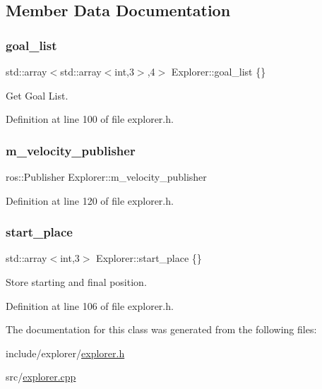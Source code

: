 \subsection{Member Data Documentation}
\mbox{\label{class_explorer_acda1856f421dfe836f39de446415b969}} 
\subsubsection{\texorpdfstring{goal\+\_\+list}{goal\_list}}
{\footnotesize\ttfamily std\+::array$<$std\+::array$<$int,3$>$,4$>$ Explorer\+::goal\+\_\+list \{\}}



Get Goal List. 



Definition at line 100 of file explorer.\+h.

\mbox{\label{class_explorer_aee857cd646f2ce6eb7e017a67e90bcdf}} 
\subsubsection{\texorpdfstring{m\+\_\+velocity\+\_\+publisher}{m\_velocity\_publisher}}
{\footnotesize\ttfamily ros\+::\+Publisher Explorer\+::m\+\_\+velocity\+\_\+publisher}



Definition at line 120 of file explorer.\+h.

\mbox{\label{class_explorer_af1aee46522a58db39d3643f2138c76fa}} 
\subsubsection{\texorpdfstring{start\+\_\+place}{start\_place}}
{\footnotesize\ttfamily std\+::array$<$int,3$>$ Explorer\+::start\+\_\+place \{\}}



Store starting and final position. 



Definition at line 106 of file explorer.\+h.



The documentation for this class was generated from the following files\+:\begin{DoxyCompactItemize}
\item 
include/explorer/\hyperlink{explorer_8h}{explorer.\+h}\item 
src/\hyperlink{explorer_8cpp}{explorer.\+cpp}\end{DoxyCompactItemize}
